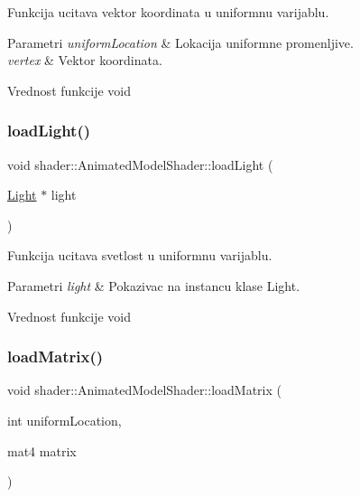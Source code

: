 Funkcija ucitava vektor koordinata u uniformnu varijablu. 


\begin{DoxyParams}{Parametri}
{\em uniform\+Location} & Lokacija uniformne promenljive. \\
\hline
{\em vertex} & Vektor koordinata. \\
\hline
\end{DoxyParams}
\begin{DoxyReturn}{Vrednost funkcije}
void 
\end{DoxyReturn}
\mbox{\label{classshader_1_1AnimatedModelShader_afd3052de306b1febcde74aa86d166a27}} 
\subsubsection{\texorpdfstring{load\+Light()}{loadLight()}}
{\footnotesize\ttfamily void shader\+::\+Animated\+Model\+Shader\+::load\+Light (\begin{DoxyParamCaption}\item[{\hyperlink{classentity_1_1Light}{Light} $\ast$}]{light }\end{DoxyParamCaption})}



Funkcija ucitava svetlost u uniformnu varijablu. 


\begin{DoxyParams}{Parametri}
{\em light} & Pokazivac na instancu klase Light. \\
\hline
\end{DoxyParams}
\begin{DoxyReturn}{Vrednost funkcije}
void 
\end{DoxyReturn}
\mbox{\label{classshader_1_1AnimatedModelShader_aeda8117c11b10329c9568be62da95049}} 
\subsubsection{\texorpdfstring{load\+Matrix()}{loadMatrix()}}
{\footnotesize\ttfamily void shader\+::\+Animated\+Model\+Shader\+::load\+Matrix (\begin{DoxyParamCaption}\item[{int}]{uniform\+Location,  }\item[{mat4}]{matrix }\end{DoxyParamCaption})}



